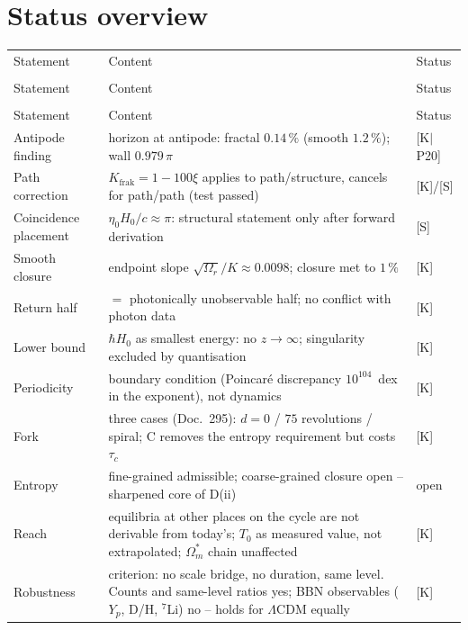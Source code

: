 \chapter{Status overview}

{\small
\begin{longtable}{lp{6.4cm}l}
\toprule
Statement & Content & Status \\\\
\midrule
\endfirsthead
\toprule
Statement & Content & Status \\\\
\midrule
\endhead
\bottomrule
\endfoot

Statement & Content & Status \\
\midrule
Antipode finding & horizon at antipode: fractal $0.14\,\%$
  (smooth $1.2\,\%$); wall $0.979\,\pi$ & [K$|$P20] \\
Path correction & $K_\text{frak} = 1-100\xi$ applies to
  path/structure, cancels for path/path (test passed) & [K]/[S] \\
Coincidence placement & $\eta_0 H_0/c \approx \pi$: structural
  statement only after forward derivation & [S] \\
Smooth closure & endpoint slope $\sqrt{\Omega_r}/K \approx 0.0098$;
  closure met to $1\,\%$ & [K] \\
Return half & $=$ photonically unobservable half; no conflict
  with photon data & [K] \\
Lower bound & $\hbar H_0$ as smallest energy: no $z\to\infty$;
  singularity excluded by quantisation & [K] \\
Periodicity & boundary condition (Poincaré discrepancy
  $10^{104}$~dex in the exponent), not dynamics & [K] \\
Fork & three cases (Doc.~295): $d=0$ / $75$ revolutions / spiral;
  C removes the entropy requirement but costs $\tau_c$ & [K] \\
Entropy & fine-grained admissible; coarse-grained closure open --
  sharpened core of D(ii) & open \\
Reach & equilibria at other places on the cycle are not derivable
  from today's; $T_0$ as measured value, not extrapolated;
  $\Omega_m^{*}$ chain unaffected & [K] \\
Robustness & criterion: no scale bridge, no duration, same level.
  Counts and same-level ratios yes; BBN observables ($Y_p$, D/H,
  ${}^7$Li) no -- holds for $\Lambda$CDM equally & [K] \\

\end{longtable}}

